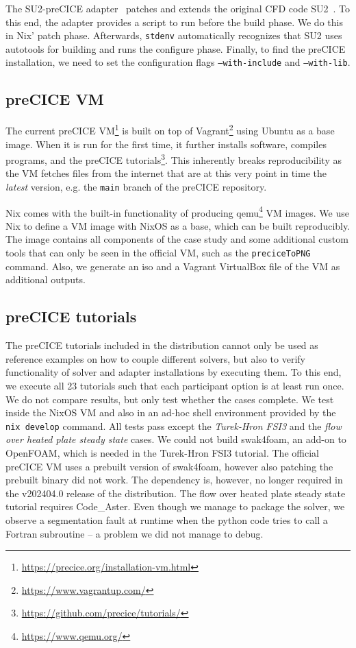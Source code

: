 \documentclass{eceasst}
\begin{document}
The SU2-preCICE adapter~\cite{Uekermann2017_Adapters} patches and extends the original CFD code SU2~\cite{su2}.
To this end, the adapter provides a script to run before the build phase.
We do this in Nix' patch phase. Afterwards, \texttt{stdenv} automatically recognizes that SU2 uses autotools for building and runs the configure phase.
Finally, to find the preCICE installation, we need to set the configuration flags \texttt{--with-include} and \texttt{--with-lib}.

\subsection{preCICE VM}

The current preCICE VM\footnote{\url{https://precice.org/installation-vm.html}} is built on top of Vagrant\footnote{\url{https://www.vagrantup.com/}} using Ubuntu as a base image.
When it is run for the first time, it further installs software, compiles programs, and the preCICE tutorials\footnote{\url{https://github.com/precice/tutorials/}}.
This inherently breaks reproducibility as the VM fetches files from the internet that are at this very point in time the \textit{latest} version, e.g. the \texttt{main} branch of the preCICE repository.

Nix comes with the built-in functionality of producing qemu\footnote{\url{https://www.qemu.org/}} VM images.
We use Nix to define a VM image with NixOS as a base, which can be built reproducibly.
The image contains all components of the case study and some additional custom tools that can only be seen in the official VM, such as the \texttt{preciceToPNG} command.
Also, we generate an iso and a Vagrant VirtualBox file of the VM as additional outputs.

\subsection{preCICE tutorials}

The preCICE tutorials included in the distribution cannot only be used as reference examples on how to couple different solvers, but also to verify functionality of solver and adapter installations by executing them.
To this end, we execute all 23 tutorials such that each participant option is at least run once. We do not compare results, but only test whether the cases complete.
We test inside the NixOS VM and also in an ad-hoc shell environment provided by the \texttt{nix develop} command. All tests pass except the \textit{Turek-Hron FSI3} and the \textit{flow over heated plate steady state} cases.
We could not build swak4foam, an add-on to OpenFOAM, which is needed in the Turek-Hron FSI3 tutorial.
The official preCICE VM uses a prebuilt version of swak4foam, however also patching the prebuilt binary did not work.
The dependency is, however, no longer required in the v202404.0 release of the distribution.
The flow over heated plate steady state tutorial requires Code\_Aster. Even though we manage to package the solver, we observe a segmentation fault at runtime when the python code tries to call a Fortran subroutine -- a problem we did not manage to debug.
\end{document}
